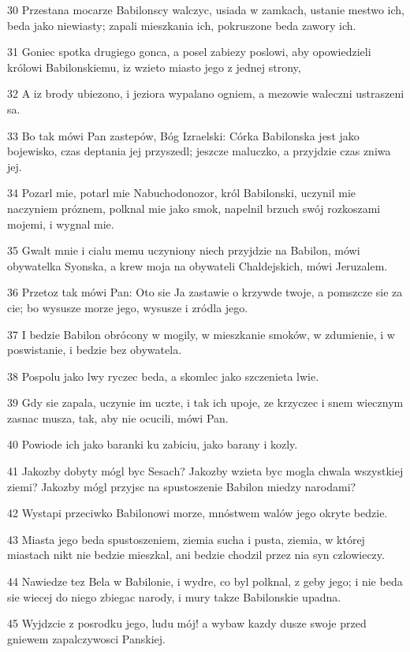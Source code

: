 \par 30 Przestana mocarze Babilonscy walczyc, usiada w zamkach, ustanie mestwo ich, beda jako niewiasty; zapali mieszkania ich, pokruszone beda zawory ich.
\par 31 Goniec spotka drugiego gonca, a posel zabiezy poslowi, aby opowiedzieli królowi Babilonskiemu, iz wzieto miasto jego z jednej strony,
\par 32 A iz brody ubiezono, i jeziora wypalano ogniem, a mezowie waleczni ustraszeni sa.
\par 33 Bo tak mówi Pan zastepów, Bóg Izraelski: Córka Babilonska jest jako bojewisko, czas deptania jej przyszedl; jeszcze maluczko, a przyjdzie czas zniwa jej.
\par 34 Pozarl mie, potarl mie Nabuchodonozor, król Babilonski, uczynil mie naczyniem próznem, polknal mie jako smok, napelnil brzuch swój rozkoszami mojemi, i wygnal mie.
\par 35 Gwalt mnie i cialu memu uczyniony niech przyjdzie na Babilon, mówi obywatelka Syonska, a krew moja na obywateli Chaldejskich, mówi Jeruzalem.
\par 36 Przetoz tak mówi Pan: Oto sie Ja zastawie o krzywde twoje, a pomszcze sie za cie; bo wysusze morze jego, wysusze i zródla jego.
\par 37 I bedzie Babilon obrócony w mogily, w mieszkanie smoków, w zdumienie, i w poswistanie, i bedzie bez obywatela.
\par 38 Pospolu jako lwy ryczec beda, a skomlec jako szczenieta lwie.
\par 39 Gdy sie zapala, uczynie im uczte, i tak ich upoje, ze krzyczec i snem wiecznym zasnac musza, tak, aby nie ocucili, mówi Pan.
\par 40 Powiode ich jako baranki ku zabiciu, jako barany i kozly.
\par 41 Jakozby dobyty mógl byc Sesach? Jakozby wzieta byc mogla chwala wszystkiej ziemi? Jakozby mógl przyjsc na spustoszenie Babilon miedzy narodami?
\par 42 Wystapi przeciwko Babilonowi morze, mnóstwem walów jego okryte bedzie.
\par 43 Miasta jego beda spustoszeniem, ziemia sucha i pusta, ziemia, w której miastach nikt nie bedzie mieszkal, ani bedzie chodzil przez nia syn czlowieczy.
\par 44 Nawiedze tez Bela w Babilonie, i wydre, co byl polknal, z geby jego; i nie beda sie wiecej do niego zbiegac narody, i mury takze Babilonskie upadna.
\par 45 Wyjdzcie z posrodku jego, ludu mój! a wybaw kazdy dusze swoje przed gniewem zapalczywosci Panskiej.
